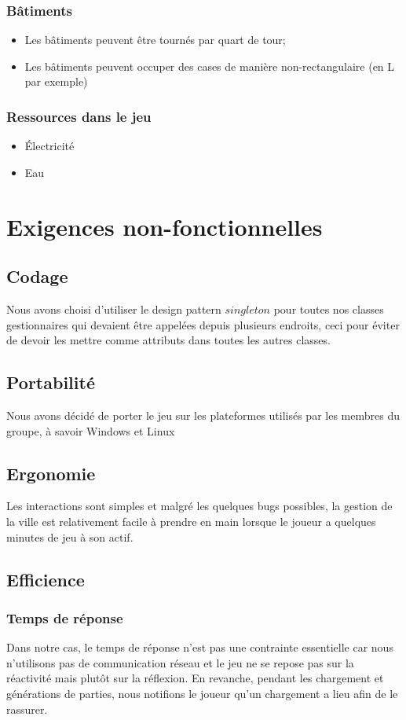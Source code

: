 \documentclass[a4paper,10pt,openany,oneside]{report}
\begin{document}
\subsubsection{Bâtiments}
\begin{itemize}
\item Les bâtiments peuvent être tournés par quart de tour;
\item Les bâtiments peuvent occuper des cases de manière non-rectangulaire (en L par exemple)
\end{itemize}

\subsubsection{Ressources dans le jeu}
\begin{itemize}
\item Électricité
\item Eau
\end{itemize}

\section{Exigences non-fonctionnelles}
\subsection{Codage}
Nous avons choisi d'utiliser le design pattern $singleton$ pour toutes nos classes gestionnaires qui devaient être appelées depuis plusieurs endroits, ceci pour éviter de devoir les mettre comme attributs dans toutes les autres classes.
\subsection{Portabilité}
Nous avons décidé de porter le jeu sur les plateformes utilisés par les membres du groupe, à savoir Windows et Linux
\subsection{Ergonomie}
Les interactions sont simples et malgré les quelques bugs possibles, la gestion de la ville est relativement facile à prendre en main lorsque le joueur a quelques minutes de jeu à son actif.
\subsection{Efficience}
\subsubsection{Temps de réponse}
Dans notre cas, le temps de réponse n'est pas une contrainte essentielle car nous n'utilisons pas de communication réseau et le jeu ne se repose pas sur la réactivité mais plutôt sur la réflexion. En revanche, pendant les chargement et générations de parties, nous notifions le joueur qu'un chargement a lieu afin de le rassurer.
\end{document}
